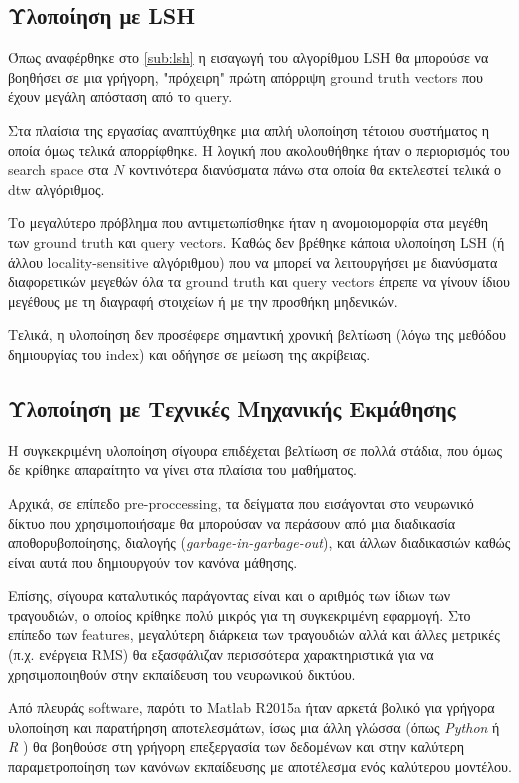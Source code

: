 \subsection{Υλοποίηση με LSH}
Όπως αναφέρθηκε στο \ref{sub:lsh} η εισαγωγή του αλγορίθμου LSH θα μπορούσε να βοηθήσει σε μια γρήγορη, "πρόχειρη" πρώτη απόρριψη ground truth vectors που έχουν μεγάλη απόσταση από το query.

Στα πλαίσια της εργασίας αναπτύχθηκε μια απλή υλοποίηση τέτοιου συστήματος η οποία όμως τελικά απορρίφθηκε.
Η λογική που ακολουθήθηκε ήταν ο περιορισμός του search space στα $N$ κοντινότερα διανύσματα πάνω στα οποία θα εκτελεστεί τελικά ο dtw αλγόριθμος.

Το μεγαλύτερο πρόβλημα που αντιμετωπίσθηκε ήταν η ανομοιομορφία στα μεγέθη των ground truth και query vectors.
Καθώς δεν βρέθηκε κάποια υλοποίηση LSH (ή άλλου locality-sensitive αλγόριθμου) που να μπορεί να λειτουργήσει με διανύσματα διαφορετικών μεγεθών όλα τα ground truth και query vectors έπρεπε να γίνουν ίδιου μεγέθους με τη διαγραφή στοιχείων ή με την προσθήκη μηδενικών.

Τελικά, η υλοποίηση δεν προσέφερε σημαντική χρονική βελτίωση (λόγω της μεθόδου δημιουργίας του index) και οδήγησε σε μείωση της ακρίβειας.

\subsection{Υλοποίηση με Τεχνικές Μηχανικής Εκμάθησης}
Η συγκεκριμένη υλοποίηση σίγουρα επιδέχεται βελτίωση σε πολλά στάδια, που όμως δε κρίθηκε απαραίτητο να γίνει στα πλαίσια του μαθήματος. 

Αρχικά, σε επίπεδο pre-proccessing, τα δείγματα που εισάγονται στο νευρωνικό δίκτυο που χρησιμοποιήσαμε θα μπορούσαν να περάσουν από μια διαδικασία αποθορυβοποίησης, διαλογής (\textit{garbage-in-garbage-out}), και άλλων διαδικασιών καθώς είναι αυτά που δημιουργούν τον κανόνα μάθησης.

Επίσης, σίγουρα καταλυτικός παράγοντας είναι και ο αριθμός των ίδιων των τραγουδιών, ο οποίος κρίθηκε πολύ μικρός για τη συγκεκριμένη εφαρμογή. 
Στο επίπεδο των features, μεγαλύτερη διάρκεια των τραγουδιών αλλά και άλλες μετρικές (π.χ. ενέργεια RMS) θα εξασφάλιζαν περισσότερα χαρακτηριστικά για να χρησιμοποιηθούν στην εκπαίδευση του νευρωνικού δικτύου.

Από πλευράς software, παρότι το Matlab R2015a \cite{matlab} ήταν αρκετά βολικό για γρήγορα υλοποίηση και παρατήρηση αποτελεσμάτων, ίσως μια άλλη γλώσσα (όπως \emph{Python} \cite{python} ή \emph{R} \cite{r_lang}) θα βοηθούσε στη γρήγορη επεξεργασία των δεδομένων και στην καλύτερη παραμετροποίηση των κανόνων εκπαίδευσης με αποτέλεσμα ενός καλύτερου μοντέλου.